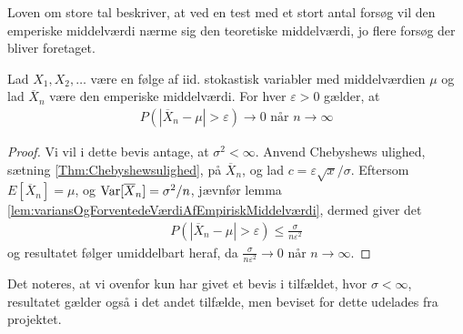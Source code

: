 Loven om store tal beskriver, at ved en test med et stort antal forsøg vil den emperiske middelværdi nærme sig den teoretiske middelværdi, jo flere forsøg der bliver foretaget.
\begin{thm} \label{thm:law_of_large_numbers}%
    Lad $X_1, X_2, \dots$ være en følge af iid. stokastisk variabler med middelværdien $\mu$ og lad $\overline{X}_{n}$ være den emperiske middelværdi. For hver $\varepsilon>0$ gælder, at
    \begin{align*}
        P(|\overline{X}_{n}-\mu|>\varepsilon) \rightarrow 0 \text{ når } n \rightarrow \infty
    \end{align*}
\end{thm}
\begin{proof}
  Vi vil i dette bevis antage, at $\sigma^{2} < \infty$. Anvend Chebyshews ulighed, sætning \ref{Thm:Chebyshewsulighed}, på $\overline{X}_{n}$, og lad $c=\varepsilon \sqrt{x}/\sigma$. Eftersom $E[\overline{X}_{n}]=\mu$, og $\textnormal{Var}[\overline{X}_{n}]=\sigma^2/n$, jævnfør lemma \ref{lem:variansOgForventedeVærdiAfEmpiriskMiddelværdi}, dermed giver det
    \begin{align*}
        P(|\overline{X}_{n}-\mu| > \varepsilon) \leq \frac{\sigma}{n\varepsilon^2}
    \end{align*}
  og resultatet følger umiddelbart heraf, da $\frac{\sigma}{n\varepsilon^2} \rightarrow 0 \text{ når } n \rightarrow \infty.$
\end{proof}
\begin{remark}
  Det noteres, at vi ovenfor kun har givet et bevis i tilfældet, hvor $\sigma < \infty$, resultatet gælder også i det andet tilfælde, men beviset for dette udelades fra projektet.
\end{remark}
